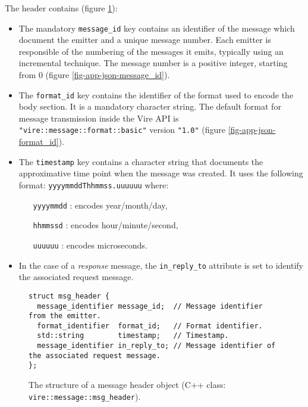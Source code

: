 The header contains (figure \ref{fig-app-json-header}):
\begin{itemize}

  \item The mandatory \texttt{message\_id}  key contains an identifier
    of the  message which  document the emitter  and a  unique message
    number.   Each emitter  is  responsible of  the  numbering of  the
    messages it  emits, typically using an  incremental technique. The
    message  number is  a positive  integer, starting  from 0  (figure
    \ref{fig-app-json-message_id}).

  \item  The \texttt{format\_id}  key contains  the identifier  of the
    format  used  to encode  the  body  section.   It is  a  mandatory
    character  string.  The  default format  for message  transmission
    inside the  Vire API is \texttt{"vire::message::format::basic"} version
    \texttt{"1.0"} (figure \ref{fig-app-json-format_id}).

  \item The  \texttt{timestamp} key  contains a character  string that
    documents  the  approximative  time  point when  the  message  was
    created.       It       uses      the       following      format:
    \texttt{yyyymmddThhmmss.uuuuuu} where:

    \vskip -10pt
    \begin{itemize}
    \item[\texttt{yyyymmdd} :] encodes year/month/day,
    \item[\texttt{hhmmssd} :] encodes hour/minute/second,
    \item[\texttt{uuuuuu} :] encodes microseconds.
    \end{itemize}

  \item   In   the   case    of   a   \emph{response}   message,   the
    \texttt{in\_reply\_to} attribute is set to identify the associated
    request message.

\end{itemize}


\begin{figure}[h]
\vskip 10pt
\small
\begin{Verbatim}[frame=single,xleftmargin=0.cm,label=\fbox{C++}]
struct msg_header {
  message_identifier message_id;  // Message identifier from the emitter.
  format_identifier  format_id;   // Format identifier.
  std::string        timestamp;   // Timestamp.
  message_identifier in_reply_to; // Message identifier of the associated request message.
};
\end{Verbatim}
\normalsize
\caption{The  structure  of  a   message  header  object  (C++  class:
  \texttt{vire::message::msg\_header}).}\label{fig-app-json-header}
\end{figure}

